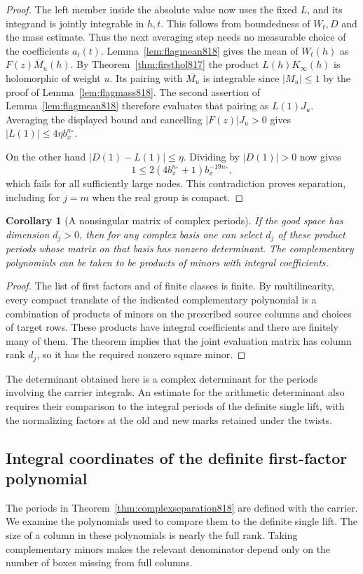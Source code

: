 \documentclass[a4paper,11pt]{article}
\newtheorem{corollary}[proposition]{Corollary}
\theoremstyle{definition}
\theoremstyle{remark}
\numberwithin{equation}{section}
\begin{document}
\begin{proof}
The left member inside the absolute value now uses the
fixed \(L\), and its integrand is jointly integrable in
\(h,t\). This follows from boundedness of \(W_t,D\) and
the mass estimate. Thus the next averaging step needs
no measurable choice of the coefficients \(a_i(t)\).
Lemma~\ref{lem:flagmean818} gives the mean of \(W_t(h)\)
as \(\overline{F(z)M_u(h)}\).
By Theorem~\ref{thm:firsthol817} the product
\(L(h)K_\infty(h)\) is holomorphic of weight \(u\).
Its pairing with \(\overline{M_u}\) is integrable since
\(|M_u|\le1\) by the proof of Lemma~\ref{lem:flagmass818}.
The second assertion of Lemma~\ref{lem:flagmean818} therefore
evaluates that pairing as \(L(1)J_u\). Averaging the
displayed bound and cancelling \(|F(z)|J_u>0\) gives
\(|L(1)|\le4\eta b_x^{n_*}\).

On the other hand \(|D(1)-L(1)|\le\eta\). Dividing by
\(|D(1)|>0\) now gives
\[
        1\le 2(4b_x^{n_*}+1)b_x^{-19n_*},
\]
which fails for all sufficiently large nodes. This
contradiction proves separation, including for \(j=m\)
when the real group is compact.
\end{proof}

\begin{corollary}[A nonsingular matrix of complex periods]
\leavevmode\label{cor:complexminor818}
If the good space has dimension \(d_j>0\), then for any
complex basis one can select \(d_j\) of these product
periods whose matrix on that basis has nonzero determinant.
The complementary polynomials can be taken to be products
of minors with integral coefficients.
\end{corollary}
\begin{proof}
The list of first factors and of finite classes is finite.
By multilinearity, every compact translate of the indicated
complementary polynomial is a combination of products of
minors on the prescribed source columns and choices of
target rows. These products have integral coefficients and
there are finitely many of them. The theorem implies that
the joint evaluation matrix has column rank \(d_j\), so it
has the required nonzero square minor.
\end{proof}

The determinant obtained here is a complex determinant for
the periods involving the carrier integrals. An estimate for
the arithmetic determinant also requires their comparison to
the integral periods of the definite single lift, with the
normalizing factors at the old and new marks retained under
the twists.
\clearpage

\subsection{Integral coordinates of the definite first-factor polynomial}
\label{sec:stackedcoordinates819}
The periods in Theorem~\ref{thm:complexseparation818} are
defined with the carrier. We examine the polynomials used
to compare them to the definite single lift. The size of
a column in these polynomials is nearly the full rank.
Taking complementary minors makes the relevant denominator
depend only on the number of boxes missing from full columns.
\end{document}
